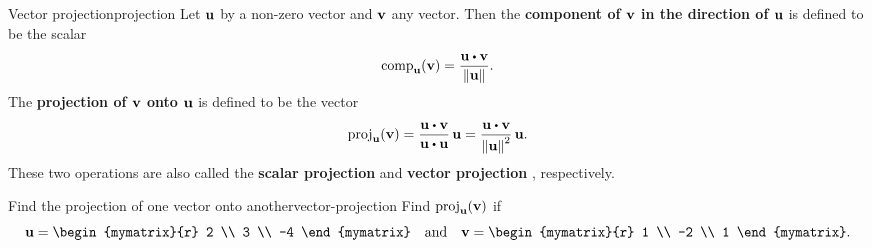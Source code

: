 \begin{definition}{Vector projection}{projection}
  Let $\vect{u}$ by a non-zero vector and $\vect{v}$ any vector. Then
  the \textbf{component of $\vect{v}$ in the direction of $\vect{u}$}%
   is defined to be the scalar
  \begin{equation*}
    \comp_{\vect{u}}(\vect{v})
    = \frac{\vect{u}\dotprod \vect{v}}{\norm{\vect{u}}}.
  \end{equation*}
  The \textbf{projection of $\vect{v}$ onto $\vect{u}$}%
   is defined to be the vector
  \begin{equation*}
    \proj_{\vect{u}}(\vect{v}) =
      \frac{\vect{u}\dotprod \vect{v}}{\vect{u}\dotprod \vect{u}}\, \vect{u}
    =
    \frac{\vect{u}\dotprod \vect{v}}{\norm{\vect{u}}^2}\,\vect{u}.
  \end{equation*}
  These two operations are also called the \textbf{scalar projection}%
   and \textbf{vector projection}%
  , respectively.
\end{definition}

\begin{example}{Find the projection of one vector onto another}{vector-projection}
  Find $\proj_{\vect{u}}(\vect{v})$ if
  \begin{equation*}
    \vect{u}=
    \begin{mymatrix}{r}
      2 \\
      3 \\
      -4
    \end{mymatrix}
    \quad\mbox{and}\quad
    \vect{v}=
    \begin{mymatrix}{r}
      1 \\
      -2 \\
      1
    \end{mymatrix}.
  \end{equation*}
\end{example}

